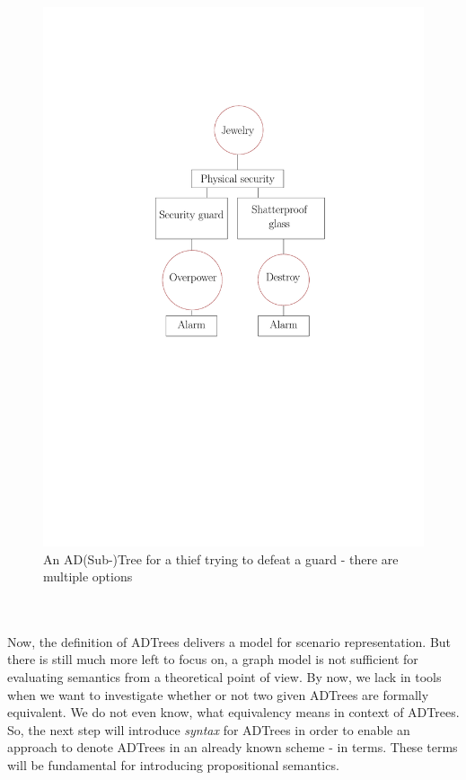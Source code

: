 \documentclass[conference]{IEEEtran}
\begin{document}
\begin{figure}[htbp]
	\centering
	\centerline{\includegraphics[width=0.85\linewidth,page=2]{graphics.pdf}}
	\caption{An AD(Sub-)Tree for a thief trying to defeat a guard - there are multiple options}
	\label{ref}
\end{figure}
%
\\\\
Now, the definition of ADTrees delivers a model for scenario representation. But there is still much more left to focus on, a graph model is not sufficient for evaluating semantics from a theoretical point of view. By now, we lack in tools when we want to investigate whether or not two given ADTrees are formally equivalent. We do not even know, what equivalency means in context of ADTrees. So, the next step will introduce \textit{syntax} for ADTrees in order to enable an approach to denote ADTrees in an already known scheme - in terms. These terms will be fundamental for introducing propositional semantics.
\end{document}
